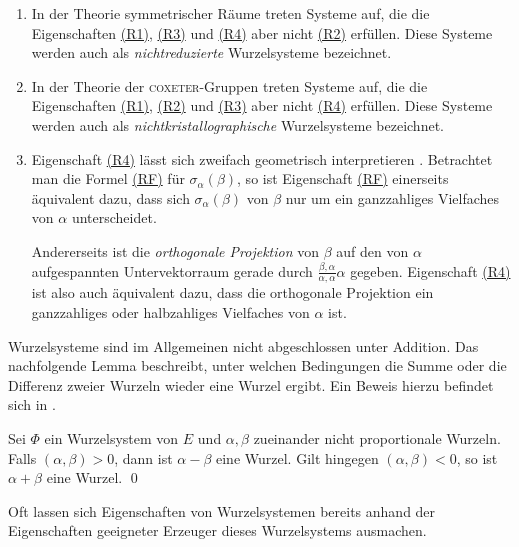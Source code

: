 \begin{bem}
  \begin{enumerate}
    \item In der Theorie symmetrischer Räume treten Systeme auf, die die Eigenschaften \hyperref[it:R1]{(R1)}, \hyperref[it:R3]{(R3)} und \hyperref[it:R4]{(R4)} aber nicht \hyperref[it:R2]{(R2)} erfüllen. 
      Diese Systeme werden auch als \emph{nichtreduzierte} Wurzelsysteme bezeichnet.
    \item In der Theorie der \textsc{coxeter}\hyp{}Gruppen treten Systeme auf, die die Eigenschaften \hyperref[it:R1]{(R1)}, \hyperref[it:R2]{(R2)} und \hyperref[it:R3]{(R3)} aber nicht \hyperref[it:R4]{(R4)} erfüllen.
      Diese Systeme werden auch als \emph{nichtkristallographische} Wurzelsysteme bezeichnet.
    \item Eigenschaft \hyperref[it:R4]{(R4)} lässt sich zweifach geometrisch interpretieren \cite[S.198]{hall2015lie}.
      Betrachtet man die Formel \hyperref[eq:RF]{\hyperref[it:RF]{(RF)}} für $\sigma_\alpha(\beta)$, so ist Eigenschaft \hyperref[eq:RF]{\hyperref[it:RF]{(RF)}} einerseits äquivalent dazu, dass sich $\sigma_\alpha(\beta)$ von $\beta$ nur um ein ganzzahliges Vielfaches von $\alpha$ unterscheidet.

      Andererseits ist die \emph{orthogonale Projektion} von $\beta$ auf den von $\alpha$ aufgespannten Untervektorraum gerade durch $\tfrac{\beta,\alpha}{\alpha,\alpha}\alpha$ gegeben.
      Eigenschaft \hyperref[it:R4]{(R4)} ist also auch äquivalent dazu, dass die orthogonale Projektion ein ganzzahliges oder halbzahliges Vielfaches von $\alpha$ ist.
  \end{enumerate}
\end{bem}

Wurzelsysteme sind im Allgemeinen nicht abgeschlossen unter Addition. 
Das nachfolgende Lemma beschreibt, unter welchen Bedingungen die Summe oder die Differenz zweier Wurzeln wieder eine Wurzel ergibt. Ein Beweis hierzu befindet sich in \cite[S.45]{humphreys1972introduction}.

\begin{lem}
  \label{lem:sumDiffRoot}
  Sei $\Phi$ ein Wurzelsystem von $E$ und $\alpha, \beta$ zueinander nicht proportionale Wurzeln.
  Falls $(\alpha, \beta) > 0$, dann ist $\alpha - \beta$ eine Wurzel.
  Gilt hingegen $(\alpha, \beta) < 0$, so ist $\alpha + \beta$ eine Wurzel. \qed
\end{lem}

Oft lassen sich Eigenschaften von Wurzelsystemen bereits anhand der Eigenschaften geeigneter Erzeuger dieses Wurzelsystems ausmachen.

